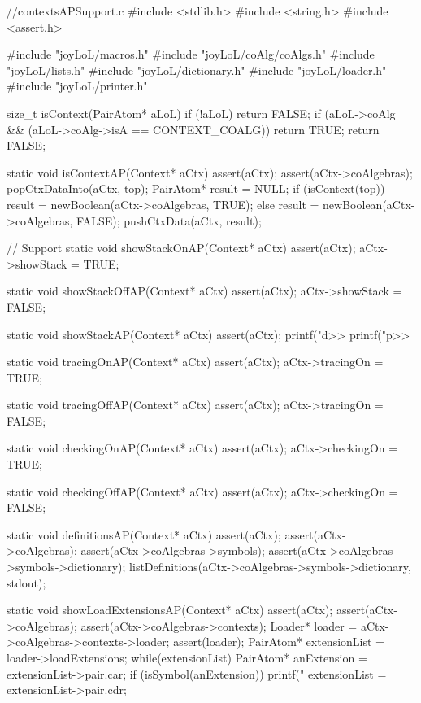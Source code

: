\starttyping
//contextsAPSupport.c
#include <stdlib.h>
#include <string.h>
#include <assert.h>


#include "joyLoL/macros.h"
#include "joyLoL/coAlg/coAlgs.h"
#include "joyLoL/lists.h"
#include "joyLoL/dictionary.h"
#include "joyLoL/loader.h"
#include "joyLoL/printer.h"

size_t isContext(PairAtom* aLoL) {
  if (!aLoL) return FALSE;
  if (aLoL->coAlg && (aLoL->coAlg->isA == CONTEXT_COALG)) return TRUE;
  return FALSE;
}

static void isContextAP(Context* aCtx) {
  assert(aCtx);
  assert(aCtx->coAlgebras);
  popCtxDataInto(aCtx, top);
  PairAtom* result = NULL;
  if (isContext(top)) result = newBoolean(aCtx->coAlgebras, TRUE);
  else                result = newBoolean(aCtx->coAlgebras, FALSE);
  pushCtxData(aCtx, result);
}

// Support
static void showStackOnAP(Context* aCtx) {
  assert(aCtx);
  aCtx->showStack = TRUE;
}

static void showStackOffAP(Context* aCtx) {
  assert(aCtx);
  aCtx->showStack = FALSE;
}

static void showStackAP(Context* aCtx) {
  assert(aCtx);
  printf("d>>%
  printf("p>>%
}

static void tracingOnAP(Context* aCtx) {
  assert(aCtx);
  aCtx->tracingOn = TRUE;
}

static void tracingOffAP(Context* aCtx) {
  assert(aCtx);
  aCtx->tracingOn = FALSE;
}

static void checkingOnAP(Context* aCtx) {
  assert(aCtx);
  aCtx->checkingOn = TRUE;
}

static void checkingOffAP(Context* aCtx) {
  assert(aCtx);
  aCtx->checkingOn = FALSE;
}

static void definitionsAP(Context* aCtx) {
  assert(aCtx);
  assert(aCtx->coAlgebras);
  assert(aCtx->coAlgebras->symbols);
  assert(aCtx->coAlgebras->symbols->dictionary);
  listDefinitions(aCtx->coAlgebras->symbols->dictionary, stdout);
}

static void showLoadExtensionsAP(Context* aCtx) {
  assert(aCtx);
  assert(aCtx->coAlgebras);
  assert(aCtx->coAlgebras->contexts);
  Loader* loader = aCtx->coAlgebras->contexts->loader;
  assert(loader);
  PairAtom* extensionList = loader->loadExtensions;
  while(extensionList) {
    PairAtom* anExtension = extensionList->pair.car;
    if (isSymbol(anExtension)) printf("%
    extensionList = extensionList->pair.cdr;
  }
}

